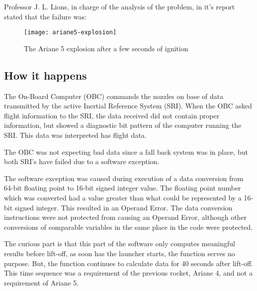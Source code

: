 \documentclass[
12pt, %
a4paper, %
oneside, %
headinclude,footinclude, %
BCOR5mm, %
]{scrartcl}
\begin{document}
Professor J. L. Lions, in charge of the analysis of the problem, in it's report \cite{Report:1996} stated that the failure was:


\begin{figure}[tb]
	\centering 
	\texttt{[image: ariane5-explosion]} 
	\caption[The Ariane 5 Explosion]{The Ariane 5 explosion after a few seconds of ignition \cite{hownottocode:2016}} %
	\label{fig:arianeexplosion} 
\end{figure}


\subsection{How it happens}

The On-Board Computer (OBC) commands the nozzles on base of data transmitted by the active Inertial Reference System (SRI). When the OBC asked flight  information to the SRI, the data received did not contain proper information,  but showed a diagnostic bit pattern of the computer running the SRI. This data was interpreted has flight data. 

The OBC was not expecting bad data since a fall back system was in place, but both SRI's have failed due to a software exception.

The software exception was caused during execution of a data conversion from 64-bit floating point to 16-bit signed integer value. The floating point number which was converted had a value greater than what could be represented by a 16-bit signed integer. This resulted in an Operand Error. The data conversion instructions were not protected from causing an Operand Error, although other conversions of comparable variables in the same place in the code were protected.

The curious part is that this part of the software only computes meaningful results before lift-off, as soon has the launcher starts, the function serves no purpose. But, the function continues to calculate data for 40 seconds after lift-off. This time sequence was a requirement of the previous rocket, Ariane 4, and not a requirement of Ariane 5.
\end{document}
